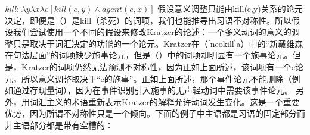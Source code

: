 \ea 
\emph{kill}: $\lambda y\lambda x\lambda e[kill(e,y) \wedge agent(e, x)]$ 
\z
\addlines
假设意义调整只能由{kill(e,y)}关系的论元决定，即便是（）是kill（杀死）的词项，我们也能推导出习语不对称性。所以假设我们尝试使用一个不同的假设来修改Kratzer的论述：一个多义动词的意义的调整只是取决于词汇决定的功能的一个论元。Kratzer在（\ref{neokill}a）中的“新戴维森在句法层面”的词项缺少施事论元，但是（）中的词项却明显有一个施事论元。但是，Kratzer的词项仍然无法预测不对称性，因为正如上面所述，该词项有一个e论元，所以意义调整取决于“e的施事”。正如上面所述，那个事件论元不能删除（例如通过存现量词），因为在事件识别引入施事的无声轻动词中需要该事件论元\citep[]{Kratzer96a}。
    另外，用词汇主义的术语重新表示Kratzer的解释允许动词发生变化。这是一个重要优势，因为所谓不对称性只是一个倾向。下面的例子中主语都是习语的固定部分而非主语部分都是带有空槽的：
